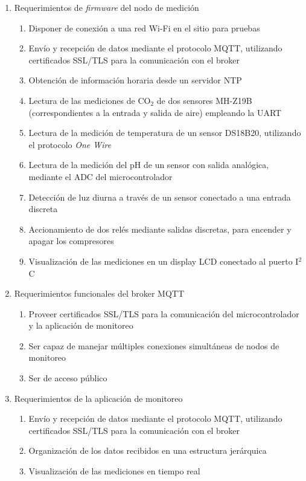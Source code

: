 \documentclass[
11pt, %
]{charter}
\begin{document}
\begin{enumerate}
	\item Requerimientos de \textit{firmware} del nodo de medición
		\begin{enumerate}
			\item Disponer de conexión a una red Wi-Fi en el sitio para pruebas
			\item Envío y recepción de datos mediante el protocolo MQTT, utilizando certificados SSL/TLS para la comunicación con el broker
			\item Obtención de información horaria desde un servidor NTP
			\item Lectura de las mediciones de CO$_2$ de dos sensores MH-Z19B (correspondientes a la entrada y salida de aire) empleando la UART
			\item Lectura de la medición de temperatura de un sensor DS18B20, utilizando el protocolo \textit{One Wire}
			\item Lectura de la medición del pH de un sensor con salida analógica, mediante el ADC del microcontrolador
			\item Detección de luz diurna a través de un sensor conectado a una entrada discreta
			\item Accionamiento de dos relés mediante salidas discretas, para encender y apagar los compresores
			\item Visualización de las mediciones en un display LCD conectado al puerto I$^2$C
		\end{enumerate}
	\item Requerimientos funcionales del broker MQTT
		\begin{enumerate}
			\item Proveer certificados SSL/TLS para la comunicación del microcontrolador y la aplicación de monitoreo
			\item Ser capaz de manejar múltiples conexiones simultáneas de nodos de monitoreo
			\item Ser de acceso público
		\end{enumerate}
	\item Requerimientos de la aplicación de monitoreo
		\begin{enumerate}
			\item Envío y recepción de datos mediante el protocolo MQTT, utilizando certificados SSL/TLS para la comunicación con el broker
			\item Organización de los datos recibidos en una estructura jerárquica
			\item Visualización de las mediciones en tiempo real 

\end{enumerate}
\end{enumerate}
\end{document}
